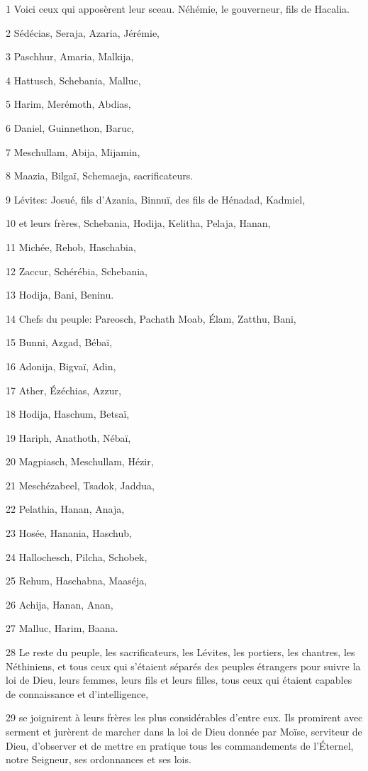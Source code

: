 \par 1 Voici ceux qui apposèrent leur sceau. Néhémie, le gouverneur, fils de Hacalia.
\par 2 Sédécias, Seraja, Azaria, Jérémie,
\par 3 Paschhur, Amaria, Malkija,
\par 4 Hattusch, Schebania, Malluc,
\par 5 Harim, Merémoth, Abdias,
\par 6 Daniel, Guinnethon, Baruc,
\par 7 Meschullam, Abija, Mijamin,
\par 8 Maazia, Bilgaï, Schemaeja, sacrificateurs.
\par 9 Lévites: Josué, fils d'Azania, Binnuï, des fils de Hénadad, Kadmiel,
\par 10 et leurs frères, Schebania, Hodija, Kelitha, Pelaja, Hanan,
\par 11 Michée, Rehob, Haschabia,
\par 12 Zaccur, Schérébia, Schebania,
\par 13 Hodija, Bani, Beninu.
\par 14 Chefs du peuple: Pareosch, Pachath Moab, Élam, Zatthu, Bani,
\par 15 Bunni, Azgad, Bébaï,
\par 16 Adonija, Bigvaï, Adin,
\par 17 Ather, Ézéchias, Azzur,
\par 18 Hodija, Haschum, Betsaï,
\par 19 Hariph, Anathoth, Nébaï,
\par 20 Magpiasch, Meschullam, Hézir,
\par 21 Meschézabeel, Tsadok, Jaddua,
\par 22 Pelathia, Hanan, Anaja,
\par 23 Hosée, Hanania, Haschub,
\par 24 Hallochesch, Pilcha, Schobek,
\par 25 Rehum, Haschabna, Maaséja,
\par 26 Achija, Hanan, Anan,
\par 27 Malluc, Harim, Baana.
\par 28 Le reste du peuple, les sacrificateurs, les Lévites, les portiers, les chantres, les Néthiniens, et tous ceux qui s'étaient séparés des peuples étrangers pour suivre la loi de Dieu, leurs femmes, leurs fils et leurs filles, tous ceux qui étaient capables de connaissance et d'intelligence,
\par 29 se joignirent à leurs frères les plus considérables d'entre eux. Ils promirent avec serment et jurèrent de marcher dans la loi de Dieu donnée par Moïse, serviteur de Dieu, d'observer et de mettre en pratique tous les commandements de l'Éternel, notre Seigneur, ses ordonnances et ses lois.
